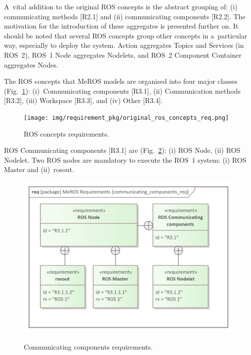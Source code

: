 \documentclass[11pt,oneside,a4paper]{report}
\begin{document}
	A~vital addition to the original ROS concepts is the abstract grouping of: (i) communicating methods [R2.1] and (ii) communicating components [R2.2]. The motivation for the introduction of these aggregates is presented further on. It should be noted that several ROS concepts group other concepts in a~particular way, especially to deploy the system. Action aggregates Topics and Services (in ROS~2), ROS~1 Node aggregates Nodelets, and ROS~2 Component Container aggregates Nodes.
	
	\pagebreak
	
	The ROS concepts that MeROS models are organised into four major classes (Fig.~\ref{fig:ros_concepts_req}): (i)~Communicating components [R3.1], (ii) Communication methods [R3.2], (iii) Workspace [R3.3], and (iv) Other [R3.4].
	

	\begin{figure}[H]
		\centering
		\begin{center}
			{\texttt{[image: img/requirement\_pkg/original\_ros\_concepts\_req.png]}}
		\end{center}
		\caption{ROS concepts requirements.} 
		\label{fig:ros_concepts_req}
	\end{figure}
	
	ROS Communicating components [R3.1] are (Fig.~\ref{fig:communicating_components_req}): (i) ROS Node, (ii) ROS Nodelet. Two ROS nodes are mandatory to execute the ROS~1 system: (i) ROS Master and (ii)~rosout.

	\begin{figure}[H]
		\centering
		\begin{center}
			{\includegraphics[scale=1.1]{img/requirement_pkg/communicating_components_req.png}}
		\end{center}
		\caption{Communicating components requirements.} 
		\label{fig:communicating_components_req}
	\end{figure}
	
\end{document}
